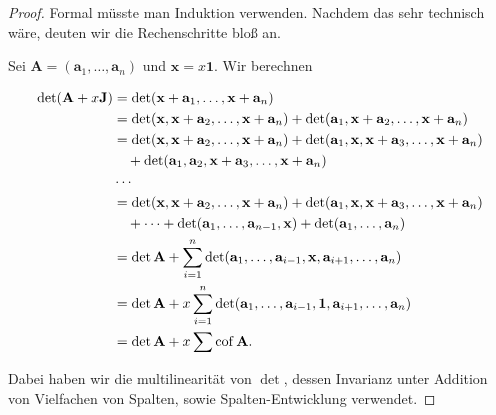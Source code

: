             \begin{proof}

                Formal müsste man Induktion verwenden.
                Nachdem das sehr technisch wäre, deuten wir die Rechenschritte bloß an.

                Sei $\mathbf A = (\mathbf a_1, \dots, \mathbf a_n)$ und $\mathbf x = x \mathbf 1$.
                Wir berechnen

                \begin{align*}
                    \det(\mathbf A + x \mathbf J)
                    & =
                    \det(\mathbf x + \mathbf a_1, \dots, \mathbf x + \mathbf a_n) \\
                    & =
                    \det(\mathbf x, \mathbf x + \mathbf a_2, \dots, \mathbf x + \mathbf a_n)
                     +
                    \det(\mathbf a_1, \mathbf x + \mathbf a_2, \dots, \mathbf x + \mathbf a_n) \\
                    & =
                    \det(\mathbf x, \mathbf x + \mathbf a_2, \dots, \mathbf x + \mathbf a_n)
                    +
                    \det(\mathbf a_1, \mathbf x, \mathbf x + \mathbf a_3, \dots, \mathbf x + \mathbf a_n) \\
                    & \quad +
                    \det(\mathbf a_1, \mathbf a_2, \mathbf x + \mathbf a_3, \dots, \mathbf x + \mathbf a_n) \\
                    & \cdots \\
                    & =
                    \det(\mathbf x, \mathbf x + \mathbf a_2, \dots, \mathbf x + \mathbf a_n)
                    +
                    \det(\mathbf a_1, \mathbf x, \mathbf x + \mathbf a_3, \dots, \mathbf x + \mathbf a_n) \\
                    & \quad +
                    \cdots
                    +
                    \det(\mathbf a_1, \dots, \mathbf a_{n-1}, \mathbf x)
                    +
                    \det(\mathbf a_1, \dots, \mathbf a_n) \\
                    & =
                    \det \mathbf A
                    +
                    \sum_{i=1}^n
                        \det(\mathbf a_1, \dots, \mathbf a_{i-1}, \mathbf x, \mathbf a_{i+1}, \dots, \mathbf a_n) \\
                    & =
                    \det \mathbf A
                    +
                    x
                    \sum_{i=1}^n
                        \det(\mathbf a_1, \dots, \mathbf a_{i-1}, \mathbf 1, \mathbf a_{i+1}, \dots, \mathbf a_n) \\
                    & =
                    \det \mathbf A + x \sum \operatorname{cof} \mathbf A.
                \end{align*}

                Dabei haben wir die multilinearität von $\det$, dessen Invarianz unter Addition von Vielfachen von Spalten, sowie Spalten-Entwicklung verwendet.

            \end{proof}

